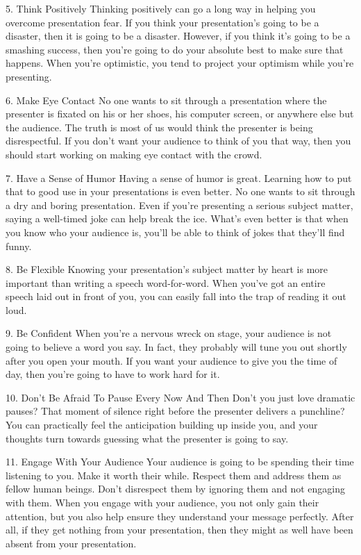 5. Think Positively
Thinking positively can go a long way in helping you overcome presentation fear. If you think your presentation's going to be a disaster, then it is going to be a disaster. However, if you think it's going to be a smashing success, then you're going to do your absolute best to make sure that happens. When you're optimistic, you tend to project your optimism while you're presenting.

6. Make Eye Contact
No one wants to sit through a presentation where the presenter is fixated on his or her shoes, his computer screen, or anywhere else but the audience. The truth is most of us would think the presenter is being disrespectful. If you don't want your audience to think of you that way, then you should start working on making eye contact with the crowd.

7. Have a Sense of Humor
Having a sense of humor is great. Learning how to put that to good use in your presentations is even better. No one wants to sit through a dry and boring presentation. Even if you're presenting a serious subject matter, saying a well-timed joke can help break the ice. What's even better is that when you know who your audience is, you'll be able to think of jokes that they'll find funny.

8. Be Flexible
Knowing your presentation's subject matter by heart is more important than writing a speech word-for-word. When you've got an entire speech laid out in front of you, you can easily fall into the trap of reading it out loud.

9. Be Confident
When you're a nervous wreck on stage, your audience is not going to believe a word you say. In fact, they probably will tune you out shortly after you open your mouth. If you want your audience to give you the time of day, then you're going to have to work hard for it.

10. Don't Be Afraid To Pause Every Now And Then Don't you just love dramatic pauses? That moment of silence right before the presenter delivers a punchline? You can practically feel the anticipation building up inside you, and your thoughts turn towards guessing what the presenter is going to say.

11. Engage With Your Audience
Your audience is going to be spending their time listening to you. Make it worth their while. Respect them and address them as fellow human beings. Don't disrespect them by ignoring them and not engaging with them. When you engage with your audience, you not only gain their attention, but you also help ensure they understand your message perfectly. After all, if they get nothing from your presentation, then they might as well have been absent from your presentation.

